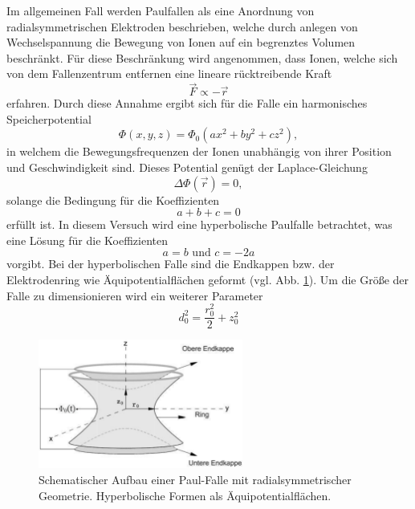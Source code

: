 \documentclass[numbers=noenddot,a4paper,notitlepage,twoside,BCOR15mm]{scrartcl}
\begin{document}
	Im allgemeinen Fall werden Paulfallen als eine Anordnung von radialsymmetrischen Elektroden beschrieben, welche durch anlegen von Wechselspannung die Bewegung von Ionen auf ein begrenztes Volumen beschränkt. Für diese Beschränkung wird angenommen, dass Ionen, welche sich von dem Fallenzentrum entfernen eine lineare rücktreibende Kraft
	\begin{equation}
		\vec{F} \propto -\vec{r}
	\end{equation} 
	erfahren. Durch diese Annahme ergibt sich für die Falle ein harmonisches Speicherpotential
	\begin{equation}
		\Phi(x,y,z) = \Phi_0 \left(ax^2+by^2+cz^2\right),
	\end{equation}
	in welchem die Bewegungsfrequenzen der Ionen unabhängig von ihrer Position und Geschwindigkeit sind. Dieses Potential genügt der Laplace-Gleichung
	\begin{equation}
		\Delta \Phi(\vec{r}) = 0,
	\end{equation}
	solange die Bedingung für die Koeffizienten
	\begin{equation}
		a+b+c = 0
	\end{equation}
	erfüllt ist. In diesem Versuch wird eine hyperbolische Paulfalle betrachtet, was eine Lösung für die Koeffizienten
	\begin{equation}
		a = b \,\,\text{und}\,\, c = -2a
	\end{equation}
	vorgibt. Bei der hyperbolischen Falle sind die Endkappen bzw. der Elektrodenring wie Äquipotentialflächen geformt (vgl. Abb. \ref{img:schem_aufbau}). Um die Größe der Falle zu dimensionieren wird ein weiterer Parameter
	\begin{equation}
		d_0^2 = \frac{r_0^2}{2}+z_0^2
	\end{equation}
		\begin{figure}[t]
			\centering
			\includegraphics[width=0.6\textwidth]{pics/paul_schema.png}
			\caption{Schematischer Aufbau einer Paul-Falle mit radialsymmetrischer Geometrie. Hyperbolische Formen als Äquipotentialflächen. \cite{EMAUGreifswaldPaul}}\label{img:schem_aufbau}
		\end{figure}
\end{document}
